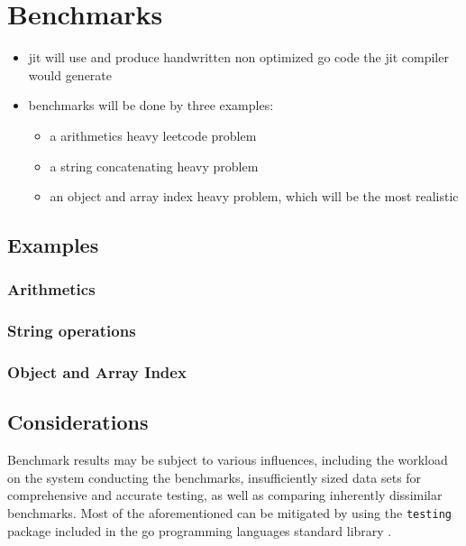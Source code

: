 \chapter{Benchmarks}

\begin{itemize}
    \item jit will use and produce handwritten non optimized go code the jit compiler would generate
    \item benchmarks will be done by three examples:
    \begin{itemize}
        \item a arithmetics heavy leetcode problem
        \item a string concatenating heavy problem
        \item an object and array index heavy problem, which will be the most realistic
    \end{itemize}
\end{itemize}

\section{Examples}

\subsection{Arithmetics}
\subsection{String operations}
\subsection{Object and Array Index}

\section{Considerations}

Benchmark results may be subject to various influences, including the workload
on the system conducting the benchmarks, insufficiently sized data sets for
comprehensive and accurate testing, as well as comparing inherently dissimilar
benchmarks. Most of the aforementioned can be mitigated by using the
\texttt{testing} package included in the go programming languages standard
library \cite{go_testing}. 

